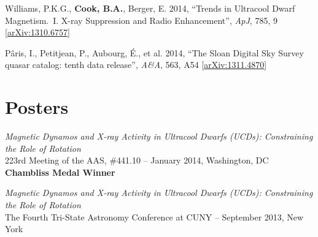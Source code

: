 \documentclass{res}
\begin{document}
\begin{resume}
Williams, P.K.G., \textbf{Cook, B.A.}, Berger, E. 2014, ``Trends in
Ultracool Dwarf Magnetism.~I. X-ray Suppression and Radio
Enhancement'', \textit{ApJ}, 785, 9
[\href{http://arxiv.org/abs/1310.6757}{arXiv:1310.6757}]

P\^{a}ris, I., Petitjean, P., Aubourg, \'E., et al. 2014, ``The Sloan
Digital Sky Survey quasar catalog: tenth data release'',
\textit{A\&A}, 563, A54
       [\href{http://arxiv.org/abs/1311.4870}{arXiv:1311.4870}]

\section{\textbf{Posters}}
\vspace{.05in}
\textit{Magnetic Dynamos and X-ray Activity in Ultracool Dwarfs (UCDs):
Constraining the Role of Rotation}\\ 223rd Meeting of the AAS,
\#441.10 -- January 2014, Washington, DC \\ \textbf{Chambliss Medal
  Winner}

\textit{Magnetic Dynamos and X-ray Activity in Ultracool Dwarfs
  (UCDs): Constraining the Role of Rotation}\\ The Fourth Tri-State
Astronomy Conference at CUNY -- September 2013, New York


\end{resume}
\end{document}
